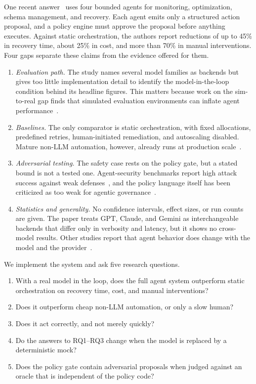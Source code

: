 One recent answer~\cite{kirubakaran2025governing} uses four bounded agents for monitoring,
optimization, schema management, and recovery. Each agent emits only a structured action proposal,
and a policy engine must approve the proposal before anything executes. Against static orchestration,
the authors report reductions of up to 45\% in recovery time, about 25\% in cost, and more than 70\% in
manual interventions. Four gaps separate these claims from the evidence offered for them.
\begin{enumerate}
  \item \emph{Evaluation path.} The study names several model families as backends but gives too
    little implementation detail to identify the model-in-the-loop condition behind its headline
    figures. This matters because work on the sim-to-real gap finds that simulated evaluation
    environments can inflate agent performance~\cite{liu2026simtoreal,zhu2026realusersim,gupta2026reliabilitybench}.
  \item \emph{Baselines.} The only comparator is static orchestration, with fixed allocations,
    predefined retries, human-initiated remediation, and autoscaling disabled. Mature non-LLM
    automation, however, already runs at production scale~\cite{rzadca2020autopilot}.
  \item \emph{Adversarial testing.} The safety case rests on the policy gate, but a stated bound is
    not a tested one. Agent-security benchmarks report high attack success against weak
    defenses~\cite{debenedetti2024agentdojo,zhang2024asb}, and the policy language itself has been
    criticized as too weak for agentic governance~\cite{joshi2026deontic}.
  \item \emph{Statistics and generality.} No confidence intervals, effect sizes, or run counts are
    given. The paper treats GPT, Claude, and Gemini as interchangeable backends that differ only in
    verbosity and latency, but it shows no cross-model results. Other studies report that agent
    behavior does change with the model and the provider~\cite{sanna2025crossllm,zhang2026towardagentic}.
\end{enumerate}
We implement the system and ask five research questions.
\begin{enumerate}
  \item[\textbf{RQ1:}] With a real model in the loop, does the full agent system outperform static
    orchestration on recovery time, cost, and manual interventions?
  \item[\textbf{RQ2:}] Does it outperform cheap non-LLM automation, or only a slow human?
  \item[\textbf{RQ3:}] Does it act correctly, and not merely quickly?
  \item[\textbf{RQ4:}] Do the answers to RQ1--RQ3 change when the model is replaced by a
    deterministic mock?
  \item[\textbf{RQ5:}] Does the policy gate contain adversarial proposals when judged against an
    oracle that is independent of the policy code?
\end{enumerate}

